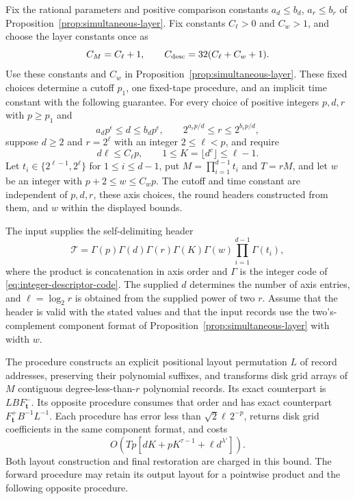 \begin{lemma}
\label{lem:synthetic-transform-cost}
Fix the rational parameters and positive comparison constants
$a_d\leq b_d$, $a_r\leq b_r$ of
Proposition~\ref{prop:simultaneous-layer}. Fix constants $C_\ell>0$
and $C_w>1$, and choose the layer constants once as
\[
 C_M=C_\ell+1,\qquad
 C_{\rm desc}=32(C_\ell+C_w+1).
\]
Use these constants and $C_w$ in
Proposition~\ref{prop:simultaneous-layer}. These fixed choices determine
a cutoff $p_1$, one fixed-tape procedure, and an implicit time constant
with the following guarantee. For every choice of positive integers
$p,d,r$ with $p\geq p_1$ and
\[
 a_dp^\epsilon\leq d\leq b_dp^\epsilon,\qquad
 2^{a_rp/d}\leq r\leq2^{b_rp/d},
\]
suppose $d\geq2$ and $r=2^\ell$ with an integer $2\leq\ell<p$, and require
\[
 d\ell\leq C_\ell p,\qquad
 1\leq K=\lfloor d^c\rfloor\leq\ell-1.
\]
Let
$t_i\in\{2^{\ell-1},2^\ell\}$ for $1\leq i\leq d-1$, put
$M=\prod_{i=1}^{d-1}t_i$ and $T=rM$, and let $w$ be an integer with
$p+2\leq w\leq C_wp$. The cutoff and time constant are independent of
$p,d,r$, these axis choices, the round headers constructed from them,
and $w$ within the displayed bounds.

The input supplies the self-delimiting header
\[
 \mathcal T=\Gamma(p)\Gamma(d)\Gamma(r)\Gamma(K)\Gamma(w)
       \prod_{i=1}^{d-1}\Gamma(t_i),
\]
where the product is concatenation in axis order and $\Gamma$ is the
integer code of \eqref{eq:integer-descriptor-code}.
The supplied $d$ determines the number of axis entries, and
$\ell=\log_2r$ is obtained from the supplied power of two $r$.
Assume that the header is valid with the stated values and that the
input records use the two's-complement component format of
Proposition~\ref{prop:simultaneous-layer} with width $w$.

The procedure constructs an explicit positional
layout permutation $L$ of record addresses, preserving their polynomial
suffixes, and transforms disk grid arrays of $M$ contiguous
degree-less-than-$r$ polynomial records. Its exact counterpart is
$LB F_{\boldsymbol t}^-$.  Its opposite procedure consumes
that order and has exact counterpart
$F_{\boldsymbol t}^+B^{-1}L^{-1}$.  Each procedure has error less than
$\sqrt2\ell\,2^{-p}$, returns disk grid coefficients in the same
component format, and costs
\begin{equation}
 O\left(Tp\left[dK+pK^{\tau-1}+\ell d^{\lambda'}\right]\right).
 \label{eq:synthetic-transform-cost}
\end{equation}
Both layout construction and final restoration are charged in this
bound.  The forward procedure may retain its output layout for a
pointwise product and the following opposite procedure.
\end{lemma}
